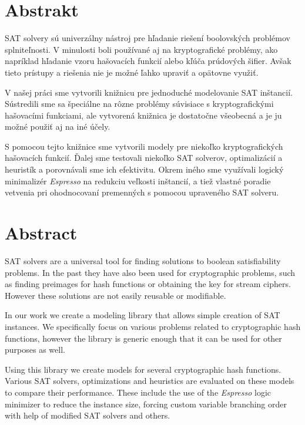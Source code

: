\chapter*{Abstrakt}
SAT solvery sú univerzálny nástroj pre hľadanie riešení boolovských problémov spl\-ni\-teľ\-no\-sti.
V minulosti boli používané aj na kryptografické problémy, ako napríklad hľadanie vzoru hašovacích funkcií alebo kľúča prúdových šifier.
Avšak tieto prístupy a riešenia nie je možné ľahko upraviť a opätovne využiť.

V našej práci sme vytvorili knižnicu pre jednoduché modelovanie SAT inštancií.
Sústredili sme sa špeciálne na rôzne problémy súvisiace s kryptografickými hašovacími funkciami, ale vytvorená knižnica je dostatočne všeobecná a je ju možné použiť aj na iné účely.

S pomocou tejto knižnice sme vytvorili modely pre niekoľko kryptografických hašovacích funkcií.
Ďalej sme testovali niekoľko SAT solverov, optimalizácií a heuristík a porovnávali sme ich efektivitu.
Okrem iného sme využívali logický minimalizér \emph{Espresso} na redukciu veľkosti inštancií, a tiež vlastné poradie vetvenia pri ohodnocovaní premenných s pomocou upraveného SAT solveru.

\chapter*{Abstract}
SAT solvers are a universal tool for finding solutions to boolean satisfiability problems.
In the past they have also been used for cryptographic problems, such as finding preimages for hash functions or obtaining the key for stream ciphers.
However these solutions are not easily reusable or modifiable.

In our work we create a modeling library that allows simple creation of SAT instances.
We specifically focus on various problems related to cryptographic hash functions, however the library is generic enough that it can be used for other purposes as well.

Using this library we create models for several cryptographic hash functions.
Various SAT solvers, optimizations and heuristics are evaluated on these models to compare their performance.
These include the use of the \emph{Espresso} logic minimizer to reduce the instance size, forcing custom variable branching order with help of modified SAT solvers and others.